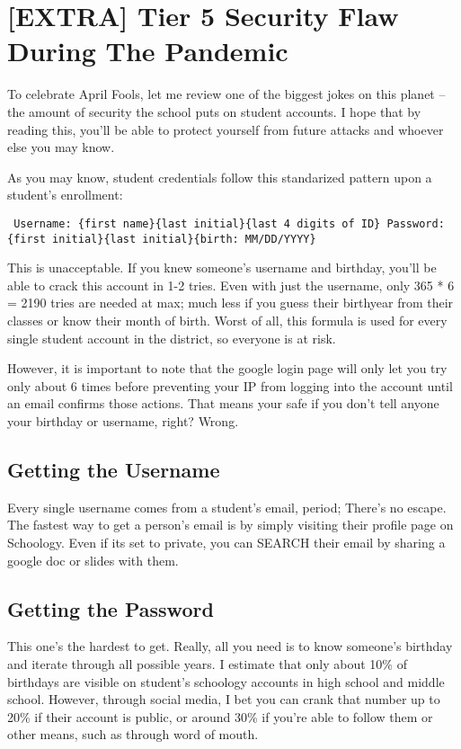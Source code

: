 \section{[EXTRA] Tier 5 Security Flaw During The Pandemic}

To celebrate April Fools, let me review one of the biggest jokes on this planet -- the amount of security the school puts on student accounts. I hope that by reading this, you'll be able to protect yourself from future attacks and whoever else you may know.

As you may know, student credentials follow this standarized pattern upon a student's enrollment:

\begin{centering}
\texttt{
Username: \{first name\}\{last initial\}\{last 4 digits of ID\} \newline
Password: \{first initial\}\{last initial\}\{birth: MM/DD/YYYY\}
}
\end{centering}

This is unacceptable. If you knew someone's username and birthday, you'll be able to crack this account in 1-2 tries. Even with just the username, only 365 * 6 = 2190 tries are needed at max; much less if you guess their birthyear from their classes or know their month of birth. Worst of all, this formula is used for every single student account in the district, so everyone is at risk.

However, it is important to note that the google login page will only let you try only about 6 times before preventing your IP from logging into the account until an email confirms those actions. That means your safe if you don't tell anyone your birthday or username, right? Wrong.

\subsection{Getting the Username}

Every single username comes from a student's email, period; There's no escape. The fastest way to get a person's email is by simply visiting their profile page on Schoology. Even if its set to private, you can SEARCH their email by sharing a google doc or slides with them.

\subsection{Getting the Password}

This one's the hardest to get. Really, all you need is to know someone's birthday and iterate through all possible years. I estimate that only about 10\% of birthdays are visible on student's schoology accounts in high school and middle school. However, through social media, I bet you can crank that number up to 20\% if their account is public, or around 30\% if you're able to follow them or other means, such as through word of mouth.

